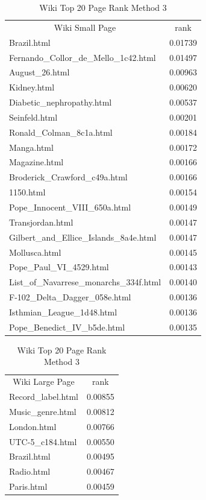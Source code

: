 \documentclass[11pt]{article}
\begin{document}
\begin{table}[h]
\centering
\caption{Wiki Top 20 Page Rank Method 3}
\label{tb:wpr3} 
\begin{minipage}{.5\textwidth}
\begin{tabular}{lc|}
\multicolumn{1}{c}{Wiki Small Page} & \multicolumn{1}{c|}{rank} \\
Brazil.html & 0.01739 \\
Fernando\_Collor\_de\_Mello\_1c42.html & 0.01497 \\
August\_26.html & 0.00963 \\
Kidney.html & 0.00620 \\
Diabetic\_nephropathy.html & 0.00537 \\
Seinfeld.html & 0.00201 \\
Ronald\_Colman\_8c1a.html & 0.00184 \\
Manga.html & 0.00172 \\
Magazine.html & 0.00166 \\
Broderick\_Crawford\_c49a.html & 0.00166 \\
1150.html & 0.00154 \\
Pope\_Innocent\_VIII\_650a.html & 0.00149 \\
Transjordan.html & 0.00147 \\
Gilbert\_and\_Ellice\_Islands\_8a4e.html & 0.00147 \\
Mollusca.html & 0.00145 \\
Pope\_Paul\_VI\_4529.html & 0.00143 \\
List\_of\_Navarrese\_monarchs\_334f.html & 0.00140 \\
F-102\_Delta\_Dagger\_058e.html & 0.00136 \\
Isthmian\_League\_1d48.html & 0.00136 \\
Pope\_Benedict\_IV\_b5de.html & 0.00135
\end{tabular}
 \end{minipage}%
    \begin{minipage}{0.5\textwidth}
    \begin{tabular}{lc}
\multicolumn{1}{c}{Wiki Large Page} & rank \\
Record\_label.html & 0.00855 \\
Music\_genre.html & 0.00812 \\
London.html & 0.00766 \\
UTC-5\_c184.html & 0.00550 \\
Brazil.html & 0.00495 \\
Radio.html & 0.00467 \\
Paris.html & 0.00459 \\

\end{tabular}
\end{minipage}
\end{table}
\end{document}
